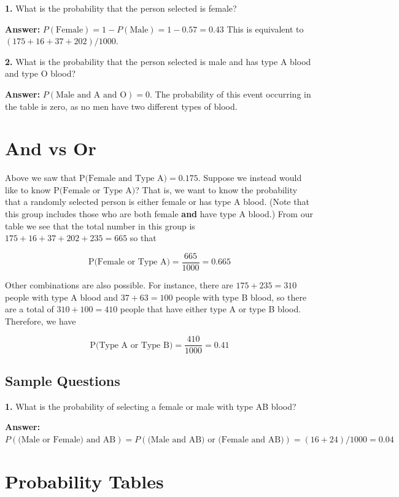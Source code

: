 \documentclass[
]{book}
\begin{document}
\textbf{1.} What is the probability that the person selected is female?

\textbf{Answer:} \(P(\text{Female}) = 1 - P(\text{Male}) = 1 - 0.57 = 0.43\) This is equivalent to \((175 + 16 + 37 + 202) / 1000\).

\textbf{2.} What is the probability that the person selected is male and has type A blood and type O blood?

\textbf{Answer:} \(P(\text{Male and A and O}) = 0\).
The probability of this event occurring in the table is zero, as no men have two different types of blood.

\hypertarget{and-vs-or}{%
\section{And vs Or}\label{and-vs-or}}

Above we saw that \(\mbox{P(Female and Type A)} = 0.175\). Suppose we instead would like to know \(\mbox{P(Female or Type A)}\)?
That is, we want to know the probability that a randomly selected person is either female or has type A blood.
(Note that this group includes those who are both female \textbf{and} have type A blood.)
From our table we see that the total number in this group is \(175 + 16 + 37 + 202 + 235 = 665\) so that

\[
\mbox{P(Female or Type A)} = \frac{665}{1000} = 0.665
\]

Other combinations are also possible.
For instance, there are \(175 + 235 = 310\) people with type A blood and \(37 + 63 = 100\) people with type B blood,
so there are a total of \(310 + 100 = 410\) people that have either type A or type B blood.
Therefore, we have

\[
\mbox{P(Type A or Type B)} = \frac{410}{1000} = 0.41
\]

\hypertarget{sample-questions-3}{%
\subsection{Sample Questions}\label{sample-questions-3}}

\textbf{1.} What is the probability of selecting a female or male with type AB blood?

\textbf{Answer:} \(P(\text{(Male or Female) and AB}) = P(\text{(Male and AB) or (Female and AB)}) = (16 + 24) / 1000 = 0.04\)

\hypertarget{probability-tables}{%
\section{Probability Tables}\label{probability-tables}}
\end{document}

